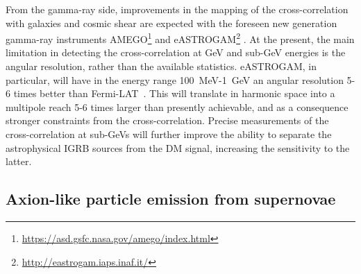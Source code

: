 

From the gamma-ray side, improvements in the mapping of the cross-correlation with galaxies and cosmic shear are 
expected with the foreseen new generation gamma-ray instruments AMEGO\footnote{\url{https://asd.gsfc.nasa.gov/amego/index.html}} and eASTROGAM\footnote{\url{http://eastrogam.iaps.inaf.it/}} \citep{1711.01265}.
At the present, the main limitation in detecting the cross-correlation at GeV and sub-GeV energies is the angular
resolution, rather than the available statistics.  eASTROGAM, in particular, will have in the energy range \mbox{100 MeV-1 GeV}
an angular resolution 5-6 times better than Fermi-LAT~\citep{1711.01265}. This will translate in harmonic space into a multipole reach 5-6 times larger than presently achievable, and as a consequence stronger constraints from the cross-correlation.
Precise measurements of the cross-correlation at sub-GeVs will further improve the ability to separate the astrophysical IGRB sources from the DM signal, increasing the sensitivity to the latter. 


\subsection{Axion-like particle emission from supernovae }

